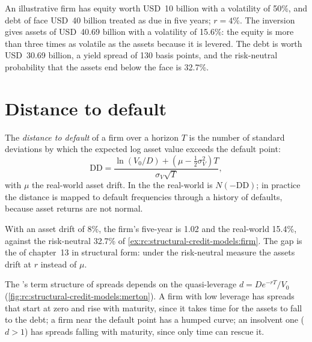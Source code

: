 \begin{example}\label{ex:rc:structural-credit-models:firm}
An illustrative firm has equity worth USD~10 billion with a volatility of 50\%, and debt
of face USD~40 billion treated as due in five years; $r = 4\%$. The inversion gives assets
of USD~40.69 billion with a volatility of 15.6\%: the equity is more than three times as
volatile as the assets because it is levered. The debt is worth USD~30.69 billion, a yield spread
of 130 basis points, and the risk-neutral probability that the assets end below the face
is 32.7\%.
\end{example}

\section{Distance to default}

\begin{definition}\label{def:rc:structural-credit-models:dd}
The \emph{distance to default} of a firm over a horizon $T$ is
the number of standard deviations by which the expected log asset value exceeds the
default point:
\[
\mathrm{DD} = \frac{\ln(V_0/D)+(\mu-\tfrac12\sigma_V^2)T}{\sigma_V\sqrt T},
\]
with $\mu$ the real-world asset drift. In the  the real-world  is $N(-\mathrm{DD})$; in practice the distance is mapped to default frequencies
through a history of defaults, because asset returns are not normal.
\end{definition}

\begin{example}\label{ex:rc:structural-credit-models:dd}
With an asset drift of 8\%, the firm's five-year  is 1.02 and the
real-world  15.4\%, against the risk-neutral 32.7\% of
\cref{ex:rc:structural-credit-models:firm}. The gap is the  of
chapter~13 in structural form: under the risk-neutral measure the assets drift at $r$
instead of $\mu$.
\end{example}

The 's term structure of spreads depends on the quasi-leverage
$d = De^{-rT}/V_0$ (\cref{fig:rc:structural-credit-models:merton}). A firm with low leverage
has spreads that start at zero and rise with maturity, since it takes time for the assets
to fall to the debt; a firm near the default point has a humped curve; an insolvent one
($d>1$) has spreads falling with maturity, since only time can rescue it.


